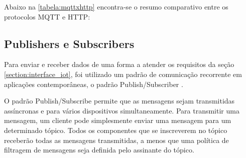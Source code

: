 Abaixo na \ref{tabela:mqttxhttp} encontra-se o resumo comparativo entre os protocolos MQTT e HTTP:

\begin{table}[h!]
\caption{Comparativo MQTT X HTTP}
\label{tabela:mqttxhttp}
\end{table}


\subsection{Publishers e Subscribers}
\label{subsection:publishers_subscribers}

Para enviar e receber dados de uma forma a atender os requisitos da seção \ref{section:interface_iot}, foi utilizado um padrão de comunicação recorrente em aplicações contemporâneas, o padrão Publish/Subscriber \cite{amazon:pub-sub}.

O padrão Publish/Subscribe permite que as mensagens sejam transmitidas assíncronas e para vários dispositivos simultaneamente. Para transmitir uma mensagem, um cliente pode simplesmente enviar uma mensagem para um determinado tópico. Todos os componentes que se inscreverem no tópico receberão todas as mensagens transmitidas, a menos que uma política de filtragem de mensagens seja definida pelo assinante do tópico.

